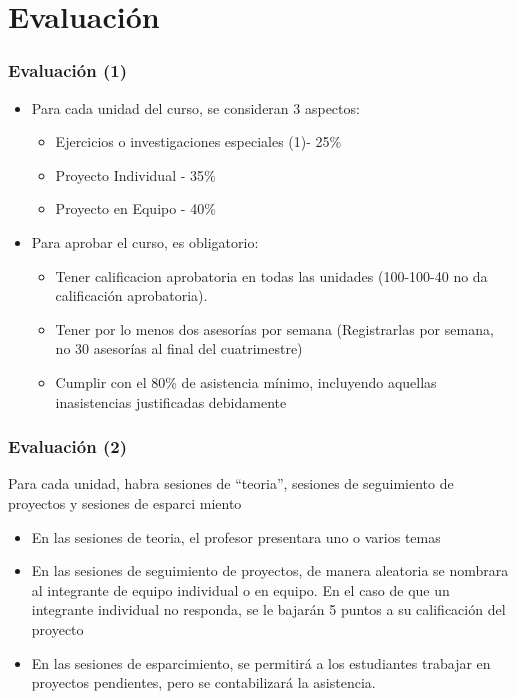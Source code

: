 \section{Evaluación}

\begin{frame}
\frametitle{Evaluación (1)}
\begin{itemize}
\item Para cada unidad del curso, se consideran 3 aspectos:
\begin{itemize}
\item Ejercicios o investigaciones especiales (1)- 25\%
\item Proyecto Individual  - 35\%
\item Proyecto en Equipo - 40\%
\end{itemize}
\item Para aprobar el curso, es obligatorio:
\begin{itemize} 
\item Tener calificacion aprobatoria en todas las unidades (100-100-40 no da calificación aprobatoria).
\item Tener por lo menos dos asesorías por semana (Registrarlas por semana, no 30 asesorías al final del cuatrimestre)
\item Cumplir con el 80\% de asistencia mínimo, incluyendo aquellas inasistencias justificadas debidamente
\end{itemize}
\end{itemize}
\end{frame}

\begin{frame}
\frametitle{Evaluación (2)}
Para cada unidad, habra sesiones de ``teoria'', sesiones de seguimiento de proyectos y sesiones de esparci  miento
\begin{itemize}
\item En las sesiones de teoria, el profesor presentara uno o varios temas
\item En las sesiones de seguimiento de proyectos, de manera aleatoria se nombrara al integrante de equipo individual o en equipo. En el caso de que un integrante individual no responda, se le bajarán 5 puntos a su calificación del proyecto
\item En las sesiones de esparcimiento, se permitirá a los estudiantes trabajar en proyectos pendientes, pero se contabilizará la asistencia. 
\end{itemize}
\end{frame}

